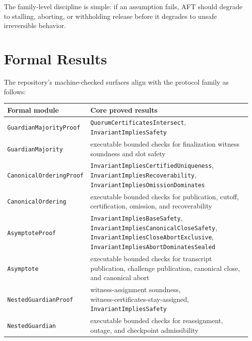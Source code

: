 \documentclass[11pt]{article}
\newcommand{\AFT}{\textsc{AFT}}
\newcommand{\code}[1]{\texttt{#1}}
\begin{document}
The family-level discipline is simple: if an assumption fails, \AFT{} should
degrade to stalling, aborting, or withholding release before it degrades to
unsafe irreversible behavior.

\section{Formal Results}

The repository's machine-checked surfaces align with the protocol family as
follows:

\begin{center}
\scriptsize
\begin{tabularx}{\textwidth}{>{\raggedright\arraybackslash}p{} X}
\toprule
\textbf{Formal module} & \textbf{Core proved results} \\
\midrule
\code{GuardianMajorityProof} & \code{QuorumCertificatesIntersect}, \code{InvariantImpliesSafety} \\
\code{GuardianMajority} & executable bounded checks for finalization witness soundness and slot safety \\
\code{CanonicalOrderingProof} & \shortstack[l]{\code{InvariantImpliesCertifiedUniqueness},\\\code{InvariantImpliesRecoverability},\\\code{InvariantImpliesOmissionDominates}} \\
\code{CanonicalOrdering} & executable bounded checks for publication, cutoff, certification, omission, and recoverability \\
\code{AsymptoteProof} & \shortstack[l]{\code{InvariantImpliesBaseSafety},\\\code{InvariantImpliesCanonicalCloseSafety},\\\code{InvariantImpliesCloseAbortExclusive},\\\code{InvariantImpliesAbortDominatesSealed}} \\
\code{Asymptote} & executable bounded checks for transcript publication, challenge publication, canonical close, and canonical abort \\
\code{NestedGuardianProof} & \shortstack[l]{witness-assignment soundness,\\witness-certificates-stay-assigned,\\\code{InvariantImpliesSafety}} \\
\code{NestedGuardian} & executable bounded checks for reassignment, outage, and checkpoint admissibility \\
\bottomrule
\end{tabularx}
\end{center}
\end{document}
